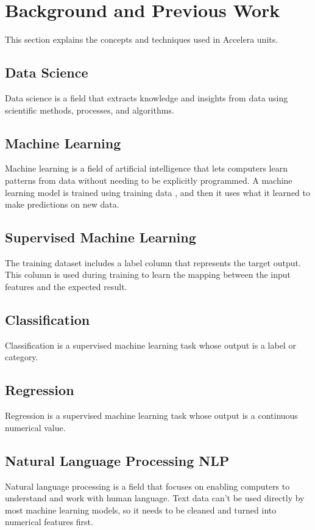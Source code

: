 \documentclass[12pt,a4paper]{report}
\begin{document}
\section{Background and Previous Work}
This section explains the concepts and techniques used in Accelera units.

\subsection{Data Science}
Data science is a field that extracts knowledge and insights from data using
scientific methods, processes, and algorithms.

\subsection{Machine Learning}
Machine learning is a field of artificial intelligence that lets computers learn patterns from data without needing to be explicitly programmed. 
A machine learning model is trained using training data , and then it uses what it learned to make predictions on new data.

\subsection{Supervised Machine Learning}
The training dataset includes a label column that represents the target output. 
This column is used during training to learn the mapping between the input features and the expected result.

\subsection{Classification}
Classification is a supervised machine learning task whose output is a label or category.

\subsection{Regression}
Regression is a supervised machine learning task whose output is a continuous numerical value.

\subsection{Natural Language Processing NLP}
Natural language processing is a field that focuses on enabling computers to understand and work with human language. Text data can't be used directly by most machine learning models, so it needs to be cleaned and turned into numerical features first.
\end{document}
